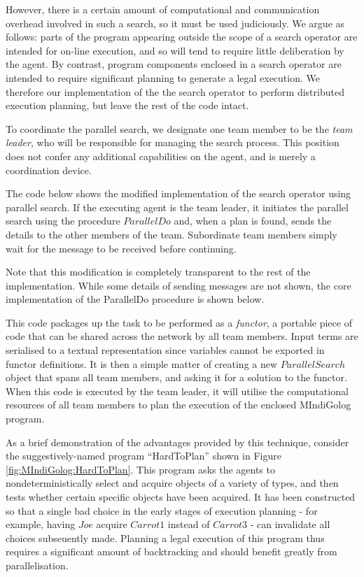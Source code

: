 However, there is a certain amount of computational and communication
overhead involved in such a search, so it must be used judiciously.
We argue as follows: parts of the program appearing outside the scope
of a search operator are intended for on-line execution, and so will
tend to require little deliberation by the agent. By contrast, program
components enclosed in a search operator are intended to require significant
planning to generate a legal execution. We therefore our implementation of the
the search operator to perform distributed execution planning,
but leave the rest of the code intact.

To coordinate the parallel search, we designate one team member to be the
\emph{team leader}, who will be responsible for managing the search process.
This position does not confer any additional capabilities on the agent, and
is merely a coordination device.

The code below shows the modified implementation of the search operator using
parallel search. If the executing agent is the team leader, it initiates
the parallel search using the procedure $ParallelDo$ and, when a plan is found, sends the details to the other members of the team. Subordinate team members
simply wait for the message to be received before continuing.


Note that this modification is completely transparent to the rest
of the implementation. While some details of sending messages are not shown,
the core implementation of the ParallelDo procedure is shown below.

This code packages up the task to be performed as a \emph{functor}, a portable
piece of code that can be shared across the network by all team members.
Input terms are serialised to a textual representation since variables
cannot be exported in functor definitions. It is then a simple matter
of creating a new $ParallelSearch$ object that spans all team members,
and asking it for a solution to the functor. When this code is executed
by the team leader,
it will utilise the computational resources of all team members to
plan the execution of the enclosed MIndiGolog program.


As a brief demonstration of the advantages provided by this technique,
consider the suggestively-named program {}``HardToPlan'' shown in
Figure \ref{fig:MIndiGolog:HardToPlan}. This program asks the agents
to nondeterministically select and acquire objects of a variety of
types, and then tests whether certain specific objects have been acquired.
It has been constructed so that a single bad choice in the early stages
of execution planning - for example, having $Joe$ acquire $Carrot1$
instead of $Carrot3$ - can invalidate all choices subseuently made.
Planning a legal execution of this program thus requires a significant
amount of backtracking and should benefit greatly from parallelisation.

